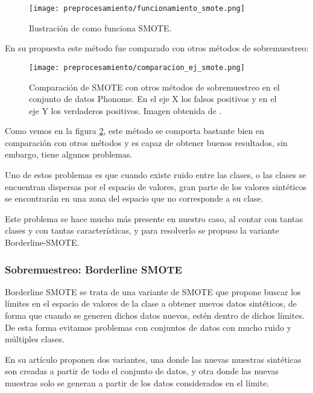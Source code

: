 \begin{figure}[H]
	\centering
	\texttt{[image: preprocesamiento/funcionamiento\_smote.png]}
	\caption{Ilustración de como funciona SMOTE.}
	\label{fig:funcionamiento_smote}
\end{figure}

\newpage

En su propuesta este método fue comparado con otros métodos de sobremuestreo:

\begin{figure}[H]
	\centering
	\texttt{[image: preprocesamiento/comparacion\_ej\_smote.png]}
	\caption{Comparación de SMOTE con otros métodos de sobremuestreo en el conjunto de datos Phonome. En el eje X los falsos positivos y en el eje Y los verdaderos positivos. Imagen obtenida de \cite{SMOTE}.}
	\label{fig:comparacionSMOTE}
\end{figure}

Como vemos en la figura \ref{fig:comparacionSMOTE}, este método se comporta bastante bien en comparación con otros métodos y es capaz de obtener buenos resultados, sin embargo, tiene algunos problemas.

Uno de estos problemas es que cuando existe ruido entre las clases, o las clases se encuentran dispersas por el espacio de valores, gran parte de los valores sintéticos se encontrarán en una zona del espacio que no corresponde a su clase.

Este problema se hace mucho más presente en nuestro caso, al contar con tantas clases y con tantas características, y para resolverlo se propuso la variante Borderline-SMOTE.


\subsubsection{Sobremuestreo: Borderline SMOTE}

Borderline SMOTE \cite{BL-SMOTE} se trata de una variante de SMOTE que propone buscar los límites en el espacio de valores de la clase a obtener nuevos datos sintéticos, de forma que cuando se generen dichos datos nuevos, estén dentro de dichos límites. De esta forma evitamos problemas con conjuntos de datos con mucho ruido y múltiples clases.

En su artículo proponen dos variantes, una donde las nuevas muestras sintéticas son creadas a partir de todo el conjunto de datos, y otra donde las nuevas muestras solo se generan a partir de los datos considerados en el límite.


